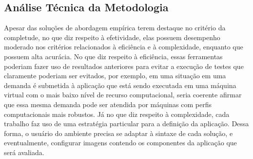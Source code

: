 \subsection{Análise Técnica da Metodologia}
Apesar das soluções de abordagem empírica terem destaque no critério da completude, no que diz respeito à efetividade, elas possuem desempenho moderado nos critérios relacionados à eficiência e à complexidade, enquanto que possuem alta acurácia. No que diz respeito à eficiência, essas ferramentas poderiam fazer uso de resultados anteriores para evitar a execução de testes que claramente poderiam ser evitados, por exemplo, em uma situação em uma demanda é submetida à aplicação que está sendo executada em uma máquina virtual com o mais baixo nível de recurso computacional, seria coerente afirmar que essa mesma demanda pode ser atendida por máquinas com perfis computacionais mais robustos. Já no que diz respeito à complexidade, cada trabalho faz uso de uma estratégia particular para a definição da aplicação. Dessa forma, o usuário do ambiente precisa se adaptar à sintaxe de cada solução, e eventualmente, configurar imagens contendo os componentes da aplicação que será avaliada.









